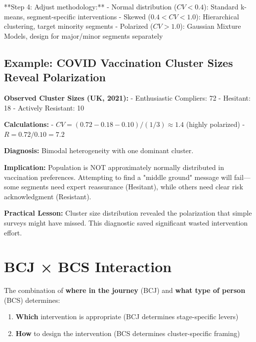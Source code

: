**Step 4: Adjust methodology:**
- Normal distribution ($CV < 0.4$): Standard k-means, segment-specific interventions
- Skewed ($0.4 < CV < 1.0$): Hierarchical clustering, target minority segments
- Polarized ($CV > 1.0$): Gaussian Mixture Models, design for major/minor segments separately

\subsection{Example: COVID Vaccination Cluster Sizes Reveal Polarization}

\textbf{Observed Cluster Sizes (UK, 2021):}
- Enthusiastic Compliers: 72%
- Hesitant: 18%
- Actively Resistant: 10%

\textbf{Calculations:}
- $CV = (0.72 - 0.18 - 0.10) / (1/3) \approx 1.4$ (highly polarized)
- $R = 0.72 / 0.10 = 7.2$

\textbf{Diagnosis:} Bimodal heterogeneity with one dominant cluster.

\textbf{Implication:} Population is NOT approximately normally distributed in vaccination
preferences. Attempting to find a "middle ground" message will fail---some segments need
expert reassurance (Hesitant), while others need clear risk acknowledgment (Resistant).

\textbf{Practical Lesson:} Cluster size distribution revealed the polarization that simple
surveys might have missed. This diagnostic saved significant wasted intervention effort.

\section{BCJ × BCS Interaction}
\label{sec:bcj-bcs}

The combination of \textbf{where in the journey} (BCJ) and
\textbf{what type of person} (BCS) determines:

\begin{enumerate}
    \item \textbf{Which} intervention is appropriate (BCJ determines stage-specific levers)
    \item \textbf{How} to design the intervention (BCS determines cluster-specific framing)
\end{enumerate}

